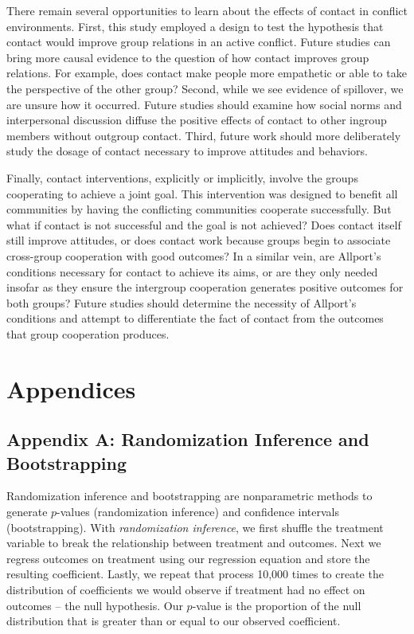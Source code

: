 \documentclass[11pt]{article}
\begin{document}
There remain several opportunities to learn about the effects of contact
in conflict environments. First, this study employed a design to test
the hypothesis that contact would improve group relations in an active
conflict. Future studies can bring more causal evidence to the question
of how contact improves group relations. For example, does contact make
people more empathetic or able to take the perspective of the other
group? Second, while we see evidence of spillover, we are unsure how it
occurred. Future studies should examine how social norms and
interpersonal discussion diffuse the positive effects of contact to
other ingroup members without outgroup contact. Third, future work
should more deliberately study the dosage of contact necessary to
improve attitudes and behaviors.

Finally, contact interventions, explicitly or implicitly, involve the
groups cooperating to achieve a joint goal. This intervention was
designed to benefit all communities by having the conflicting
communities cooperate successfully. But what if contact is not
successful and the goal is not achieved? Does contact itself still
improve attitudes, or does contact work because groups begin to
associate cross-group cooperation with good outcomes? In a similar vein,
are Allport's conditions necessary for contact to achieve its aims, or
are they only needed insofar as they ensure the intergroup cooperation
generates positive outcomes for both groups? Future studies should
determine the necessity of Allport's conditions and attempt to
differentiate the fact of contact from the outcomes that group
cooperation produces.

\hypertarget{appendices}{%
\section{Appendices}\label{appendices}}

\hypertarget{appendix-a-randomization-inference-and-bootstrapping}{%
\subsection{Appendix A: Randomization Inference and
Bootstrapping}\label{appendix-a-randomization-inference-and-bootstrapping}}

Randomization inference and bootstrapping are nonparametric methods to
generate \(p\)-values (randomization inference) and confidence intervals
(bootstrapping). With \emph{randomization inference}, we first shuffle
the treatment variable to break the relationship between treatment and
outcomes. Next we regress outcomes on treatment using our regression
equation and store the resulting coefficient. Lastly, we repeat that
process 10,000 times to create the distribution of coefficients we would
observe if treatment had no effect on outcomes -- the null hypothesis.
Our \(p\)-value is the proportion of the null distribution that is
greater than or equal to our observed coefficient.
\end{document}

